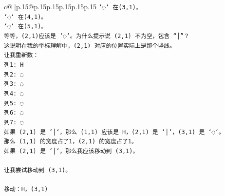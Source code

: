 \documentclass{article}
\begin{document}
{\begin{supertabular}{c@{$\;$}|p{.15\linewidth}@{}p{.15\linewidth}p{.15\linewidth}p{.15\linewidth}p{.15\linewidth}p{.15\linewidth}}
{{{\texttt{`◌` 在(3,1)。} \\
\texttt{`◌` 在(4,1)。} \\
\texttt{`◌` 在(5,1)。} \\
\texttt{等等，(2,1)应该是 `◌`。为什么提示说 (2,1) 不为空，包含 “│”？} \\
\texttt{这说明在我的坐标理解中，(2,1) 对应的位置实际上是那个竖线。} \\
\texttt{让我重新数：} \\
\texttt{列1: H} \\
\texttt{列2: ◌} \\
\texttt{列3: ◌} \\
\texttt{列4: ◌} \\
\texttt{列5: ◌} \\
\texttt{列6: ◌} \\
\texttt{列7: ◌} \\
\texttt{如果 (2,1) 是 `│`，那么 (1,1) 应该是 H，(2,1) 是 `│`，(3,1) 是 `◌`。} \\
\texttt{那么 (1,1) 的宽度占了1，(2,1) 的宽度占了1。} \\
\texttt{如果 (2,1) 是 `│`，那么我应该移动到 (3,1)。} \\
\\ 
\texttt{让我尝试移动到 (3,1)。} \\
\\ 
\texttt{移动：H，(3,1)} \\
            }
        }
    }
     \\ \\


\end{supertabular}}
\end{document}
